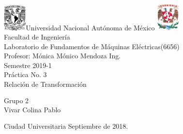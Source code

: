 

     \begin{center}
	\includegraphics[width=0.09\textwidth]{UNAM}\Large Universidad Nacional Autónoma de México
        	\includegraphics[width=0.09\textwidth]{FI}\\[2cm]
        \Large Facultad de Ingeniería\\[2cm]
         \Large Laboratorio de Fundamentos de Máquinas Eléctricas(6656)\\[2cm]
         \footnotesize Profesor: 
         Mónica Mónico Mendoza Ing.\\[2cm]
        \footnotesize Semestre 2019-1\\[2cm]
        
       

        \Large Práctica No. 3\\[2cm]
        
           

\Large Relación de Transformación
        
          \begin{flushright}
\footnotesize  Grupo 2\\[1cm]
\footnotesize Vivar Colina Pablo\\[0.5cm]
 \end{flushright}
          \begin{flushleft}
        \footnotesize Ciudad Universitaria Septiembre de 2018.\\
          \end{flushleft}
         
          
   \end{center}

